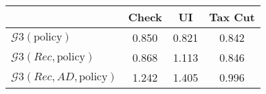 \begin{tabular}{@{}lccc@{}} 
\toprule 
                          & Check      & UI    & Tax Cut    \\  \midrule 
$\mathcal{G}3(\text{policy})$ & 0.850  & 0.821  & 0.842     \\ 
$\mathcal{G}3(Rec,\text{policy})$ & 0.868  & 1.113  & 0.846     \\ 
$\mathcal{G}3(Rec, AD,\text{policy})$ & 1.242  & 1.405  & 0.996     \\ 
\end{tabular}  
